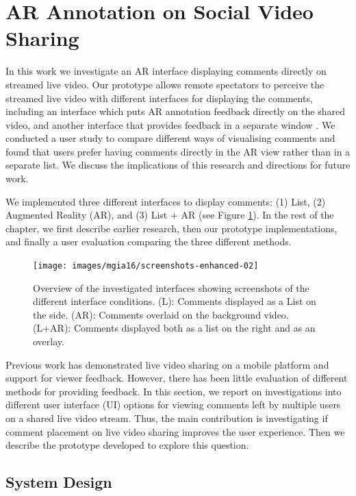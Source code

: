 
\section{AR Annotation on Social Video Sharing}
\label{sec:video}

In this work we investigate an AR interface displaying comments directly on streamed live video. Our prototype allows remote spectators to perceive the streamed live video with different interfaces for displaying the comments, including an interface which puts AR annotation feedback directly on the shared video, and another interface that provides feedback in a separate window \cite{Nassani2016}. We conducted a user study to compare different ways of visualising comments and found that users prefer having comments directly in the AR view rather than in a separate list. We discuss the implications of this research and directions for future work.

We implemented three different interfaces to display comments: (1) List, (2) Augmented Reality (AR), and (3) List + AR (see Figure \ref{fig:mgia16:conditions}). In the rest of the chapter, we first describe earlier research, then our prototype implementations, and finally a user evaluation comparing the three different methods.

\begin{figure}
  \texttt{[image: images/mgia16/screenshots-enhanced-02]}
  \caption{Overview of the investigated interfaces showing screenshots of the different interface conditions. (L): Comments displayed as a List on the side. (AR): Comments overlaid on the background video. (L+AR): Comments displayed both as a list on the right and as an overlay. }
  \label{fig:mgia16:conditions}
\end{figure}

Previous work has demonstrated live video sharing on a mobile platform and support for viewer feedback. However, there has been little evaluation of different methods for providing feedback. In this section, we report on investigations into different user interface (UI) options for viewing comments left by multiple users on a shared live video stream. Thus, the main contribution is investigating if comment placement on live video sharing improves the user experience. Then we describe the prototype developed to explore this question.

\subsection{System Design}

